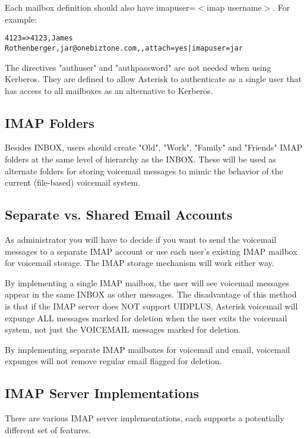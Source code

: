 Each mailbox definition should also have imapuser=$<$imap username$>$.
For example:
\begin{astlisting}
\begin{verbatim}
4123=>4123,James Rothenberger,jar@onebiztone.com,,attach=yes|imapuser=jar
\end{verbatim}
\end{astlisting}

The directives "authuser" and "authpassword" are not needed when using
Kerberos. They are defined to allow Asterisk to authenticate as a single
user that has access to all mailboxes as an alternative to Kerberos.


\subsection{IMAP Folders}

Besides INBOX, users should create "Old", "Work", "Family" and "Friends"
IMAP folders at the same level of hierarchy as the INBOX.  These will be
used as alternate folders for storing voicemail messages to mimic the
behavior of the current (file-based) voicemail system.


\subsection{Separate vs. Shared Email Accounts}

As administrator you will have to decide if you want to send the voicemail
messages to a separate IMAP account or use each user's existing IMAP mailbox
for voicemail storage.  The IMAP storage mechanism will work either way.

By implementing a single IMAP mailbox, the user will see voicemail messages
appear in the same INBOX as other messages.  The disadvantage of this method
is that if the IMAP server does NOT support UIDPLUS, Asterisk voicemail will
expunge ALL messages marked for deletion when the user exits the voicemail
system, not just the VOICEMAIL messages marked for deletion.

By implementing separate IMAP mailboxes for voicemail and email, voicemail
expunges will not remove regular email flagged for deletion.


\subsection{IMAP Server Implementations}

There are various IMAP server implementations, each supports a potentially
different set of features.


